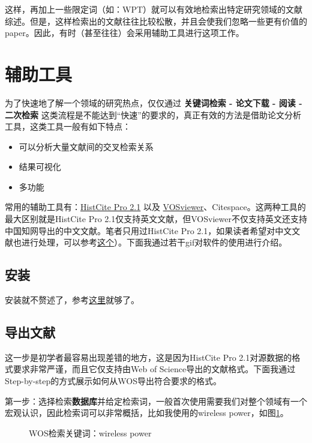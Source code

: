 \documentclass[UTF8,oneside]{ctexbook}
\begin{document}
这样，再加上一些限定词（如：WPT）就可以有效地检索出特定研究领域的文献综述。但是，这样检索出的文献往往比较松散，并且会使我们忽略一些更有价值的paper。因此，有时（甚至往往）会采用辅助工具进行这项工作。

\section{辅助工具}
为了快速地了解一个领域的研究热点，仅仅通过 {\bf 关键词检索 - 论文下载 - 阅读 - 二次检索} 这类流程是不能达到“快速”的要求的，真正有效的方法是借助论文分析工具，这类工具一般有如下特点：

\begin{itemize}
	\item 可以分析大量文献间的交叉检索关系
	\item 结果可视化
	\item 多功能
\end{itemize}

常用的辅助工具有：\href{https://zhuanlan.zhihu.com/p/20902898}{HistCite Pro 2.1} 以及 \href{https://zhuanlan.zhihu.com/p/30970993}{VOSviewer}、Citespace。这两种工具的最大区别就是HistCite Pro 2.1仅支持英文文献，但VOSviewer不仅支持英文还支持中国知网导出的中文文献。笔者只用过HistCite Pro 2.1，如果读者希望对中文文献也进行处理，可以参考\href{https://www.jianshu.com/p/e20f3f1d17d8}{这个}）。下面我通过若干gif对软件的使用进行介绍。
\subsection{安装}
安装就不赘述了，参考\href{https://zhuanlan.zhihu.com/p/20902898}{这里}就够了。
\subsection{导出文献}
这一步是初学者最容易出现差错的地方，这是因为HistCite Pro 2.1对源数据的格式要求非常严谨，而且它仅支持由Web of Science导出的文献格式。下面我通过Step-by-step的方式展示如何从WOS导出符合要求的格式。

第一步：选择检索{\bf 数据库}并给定检索词，一般首次使用需要我们对整个领域有一个宏观认识，因此检索词可以非常概括，比如我使用的wireless power，如图\ref{fig:1}。

\begin{figure}[!htb]
	\centering
	\vspace{-0.3cm}
	\caption{WOS检索关键词：wireless power}\label{fig:1}
\end{figure}
\end{document}
